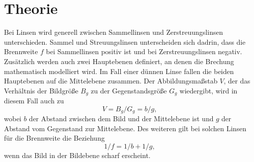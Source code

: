 \section{Theorie}
\label{sec:Theorie}

    \noindent Bei Linsen wird generell zwischen Sammellinsen und Zerstreuungslinsen unterschieden. Sammel und Streuungslinsen unterscheiden sich dadrin, dass die Brennweite $f$ bei Sammellinsen positiv ist und bei Zerstreuungslinsen negativ.
    Zusätzlich werden auch zwei Hauptebenen definiert, an denen die Brechung mathematisch modelliert wird. Im Fall einer dünnen Linse fallen die beiden Hauptebenen auf die Mittelebene zusammen. Der Abbildungsmaßstab $V$, der das Verhältnis der Bildgröße $B_g$
    zu der Gegenstandsgröße $G_g$ wiedergibt, wird in diesem Fall auch zu
    \begin{equation}
        V=B_g/G_g=b/g \text{,}
        \label{eqn:abbildung}
    \end{equation}
    \noindent wobei $b$ der Abstand zwischen dem Bild und der Mittelebene ist und $g$ der Abstand vom Gegenstand zur Mittelebene.
    Des weiteren gilt bei solchen Linsen für die Brennweite die Beziehung
    \begin{equation}
        1/f=1/b+1/g \text{,}
        \label{eqn:brenn1}
    \end{equation}
    \noindent wenn das Bild in der Bildebene scharf erscheint.


\cite{sample}
